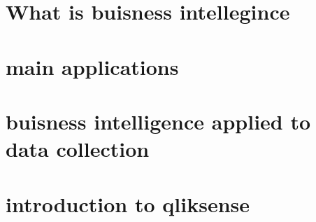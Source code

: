 \documentclass[../main.tex]{subfiles}
\begin{document}
\section{What is buisness intellegince}
\section{main applications}
\section{buisness intelligence applied to data collection}
\section{introduction to qliksense}
\cleardoublepage
\end{document}

